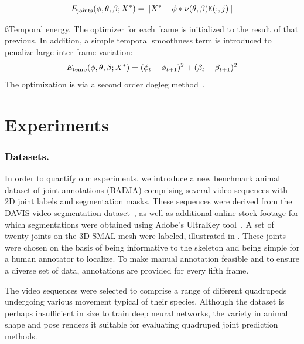   \begin{equation}
  {E_{\text{joints}}}(\phi, \theta, \beta; X^{*}) = 
  \lVert X^{*} - \phi * \nu(\theta,\beta)\mathtt{K}(:,j) \rVert
  \end{equation}
  
  \ss{Temporal energy.}
  The optimizer for each frame is initialized to the result of that previous. In addition, a simple temporal smoothness term is introduced to penalize large inter-frame variation:
  \begin{equation}
  {E_{\text{temp}}}(\phi, \theta, \beta; X^{*}) = (\phi_t - \phi_{t+1})^2 + (\beta_t - \beta_{t+1})^2
  \end{equation}
  The optimization is via a second order dogleg method~\cite{lourakis2005levenberg}.
  
  \section{Experiments}
  \subsubsection*{Datasets.}
  In order to quantify our experiments, we introduce a new benchmark animal dataset of joint annotations (BADJA) comprising several video sequences with 2D joint labels and segmentation masks.
  These sequences were derived from the DAVIS video segmentation dataset~\cite{Perazzi2016}, as well as additional online stock footage for which segmentations were obtained using Adobe's UltraKey tool~\cite{adobe_ultrakey}. A set of twenty joints on the 3D SMAL mesh were labeled, illustrated in . These joints were chosen on the basis of being informative to the skeleton and being simple for a human annotator to localize. To make manual annotation feasible and to ensure a diverse set of data, annotations are provided for every fifth frame. 
  
  The video sequences were selected to comprise a range of different quadrupeds undergoing various movement typical of their species. Although the dataset is perhaps insufficient in size to train deep neural networks, the variety in animal shape and pose renders it suitable for evaluating quadruped joint prediction methods. 
  
